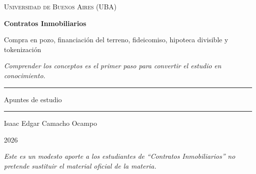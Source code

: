 \documentclass[12pt,oneside]{book}
\newcommand{\universidad}{Universidad de Buenos Aires (UBA)}
\newcommand{\materia}{Contratos Inmobiliarios}
\newcommand{\subtitulo}{Compra en pozo, financiación del terreno, fideicomiso, hipoteca divisible y tokenización}
\newcommand{\autor}{Isaac Edgar Camacho Ocampo}
\newcommand{\anio}{2026}
\begin{document}
\begin{titlepage}

\thispagestyle{empty}

\begin{center}

\vspace*{1cm}

{\large \textsc{\universidad}}

\vspace{3cm}

{\Huge \textbf{\materia}}

\vspace{1cm}

{\Large \subtitulo}

\vspace{0.8cm}

\textit{Comprender los conceptos es el primer paso para convertir el estudio en conocimiento.}

\vspace{1.2cm}

\rule{0.70\textwidth}{0.5pt}

\vspace{0.5cm}

{\large Apuntes de estudio}

\vspace{0.5cm}

\rule{0.70\textwidth}{0.5pt}

\vfill

{\large \autor}

\vspace{0.3cm}

{\large \anio}

\end{center}

\vfill

\begin{flushleft}
\textit{Este es un modesto aporte a los estudiantes de ``\materia'' no pretende sustituir el material oficial de la materia.}
\end{flushleft}

\end{titlepage}

\tableofcontents
\end{document}
